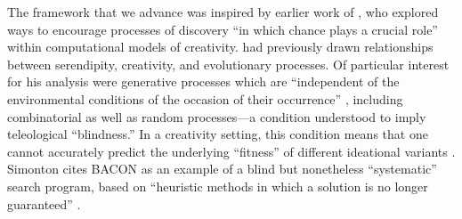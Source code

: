 





The framework that we advance was inspired by earlier work of
\citet{pease2013discussion}, who explored ways to encourage
processes of discovery ``in which chance plays a crucial role'' within
computational models of creativity.
\citet{simonton2010creative} had previously drawn relationships
between serendipity, creativity, and evolutionary processes. Of
particular interest for his analysis were generative processes which
are ``independent of the environmental conditions of the occasion of
their occurrence'' \cite{campbell1960blind}, including combinatorial
as well as random processes---a condition understood to imply
teleological ``blindness.''  In a creativity setting, this condition
means that one cannot accurately predict the underlying ``fitness'' of
different ideational variants \cite[p.~159]{simonton2010creative}.
Simonton cites {\sf BACON} \cite{langley1987scientific} as an example
of a blind but nonetheless ``systematic'' search program, based on
``heuristic methods in which a solution is no longer guaranteed''
\cite[p.~169]{simonton2010creative}.
